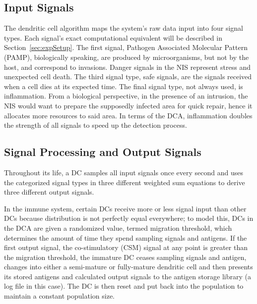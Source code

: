 \documentclass{umm-senior-sem}
\begin{document}
\subsection{Input Signals}
The dendritic cell algorithm maps the system's raw data input into four signal types. Each signal's exact computational equivalent will be described in Section~\ref{sec:expSetup}. The first signal, Pathogen Associated Molecular Pattern (PAMP), biologically speaking, are produced by microorganisms, but not by the host, and correspond to invasions.  Danger signals in the NIS represent stress and unexpected cell death. The third signal type, safe signals, are the signals received when a cell dies at its expected time. The final signal type, not always used, is inflammation. From a biological perspective, in the presence of an intrusion, the NIS would want to prepare the supposedly infected area for quick repair, hence it allocates more resources to said area. In terms of the DCA, inflammation doubles the strength of all signals to speed up the detection process. 

\subsection{Signal Processing and Output Signals}
\label{sec:outputSignals}
Throughout its life, a DC samples all input signals once every second and uses the categorized signal types in three different weighted sum equations to derive three different output signals. 

In the immune system, certain DCs receive more or less signal input than other DCs because distribution is not perfectly equal everywhere; to model this, DCs in the DCA are given a randomized value, termed migration threshold, which determines the amount of time they spend sampling signals and antigens. 
If the first output signal, the co-stimulatory (CSM) signal at any point is greater than the migration threshold, the immature DC ceases sampling signals and antigen, changes into either a semi-mature or fully-mature dendritic cell and then presents its stored antigens and calculated output signals to the antigen storage library (a log file in this case). The DC is then reset and put back into the population to maintain a constant population size.  
\end{document}
